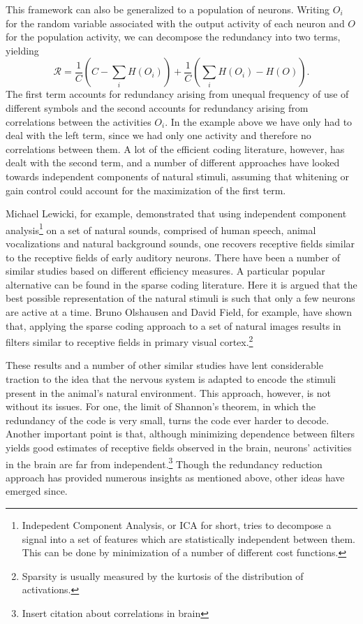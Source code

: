 This framework can also be generalized to a population of neurons. Writing $O_i$ for the random variable associated with the output activity of each neuron and $O$ for the population activity, we can decompose the redundancy into two terms, yielding
$$
\mathcal{R} = \frac{1}{C} \left(C - \sum_i H(O_i) \right) + \frac{1}{C}\left(\sum_i H(O_i) -H(O)\right).
$$
The first term accounts for redundancy arising from unequal frequency of use of different symbols and the second accounts for redundancy arising from correlations between the activities $O_i$. In the example above we have only had to deal with the left term, since we had only one activity and therefore no correlations between them. A lot of the efficient coding literature, however, has dealt with the second term, and a number of different approaches have looked towards independent components of natural stimuli, assuming that whitening or gain control could account for the maximization of the first term.\par
Michael Lewicki,\cite{Lewicki2002} for example, demonstrated that using independent component analysis\footnote{Indepedent Component Analysis, or ICA for short, tries to decompose a signal into a set of features which are statistically independent between them. This can be done by minimization of a number of different cost functions.} on a set of natural sounds, comprised of human speech, animal vocalizations and natural background sounds, one recovers receptive fields similar to the receptive fields of early auditory neurons. There have been a number of similar studies based on different efficiency measures. A particular popular alternative can be found in the sparse coding literature. Here it is argued that the best possible representation of the natural stimuli is such that only a few neurons are active at a time. Bruno Olshausen and David Field,\cite{Olshausen1996} for example, have shown that, applying the sparse coding approach to a set of natural images results in filters similar to receptive fields in primary visual cortex.\footnote{Sparsity is usually measured by the kurtosis of the distribution of activations.}\par
These results and a number of other similar studies have lent considerable traction to the idea that the nervous system is adapted to encode the stimuli present in the animal's natural environment. This approach, however, is not without its issues. For one, the limit of Shannon's theorem, in which the redundancy of the code is very small, turns the code ever harder to decode. Another important point is that, although minimizing dependence between filters yields good estimates of receptive fields observed in the brain, neurons' activities in the brain are far from independent.\footnote{Insert citation about correlations in brain} Though the redundancy reduction approach has provided numerous insights as mentioned above, other ideas have emerged since.
